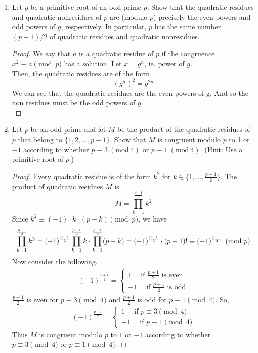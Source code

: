 \documentclass[11pt]{article}
\theoremstyle{definition}
\newcommand{\Mod}[1]{\ (\mathrm{mod}\ #1)}
\begin{document}
\begin{enumerate}
\begin{enumerate}
    \end{enumerate}

    \item Let $g$ be a primitive root of an odd prime $p$. Show that the quadratic residues and quadratic nonresidues of $p$ are (modulo $p$) precisely the even powers and odd powers of $g$, respectively. In particular, $p$ has the same number $(p-1)/2$ of quadratic residues and quadratic nonresidues.
    \begin{proof}
        We say that $a$ is a quadratic residue of $p$ 
        if the congruence $x^2\equiv a\pmod{p}$ has a solution.
        Let $x = g^n$, ie. power of $g$. \\
        Then, the quadratic residues are of the form
        \[
            (g^n)^2 = g^{2n}
        \]
        We can see that the quadratic residues are the even powers of g.
        And so the non residues must be the odd powers of $g$. \\
    \end{proof}

    \item Let $p$ be an odd prime and let $M$ be the product of the quadratic residues of $p$ that belong to $\{1,2,\dots, p-1\}$. Show that $M$ is congruent modulo $p$ to 1 or $-1$ according to whether $p\equiv 3\Mod 4$ or $p\equiv 1\Mod 4$. (Hint: Use a primitive root of $p$.)
    \begin{proof}
        Every quadratic residue is of the form $k^2$ for 
        $k\in\{1,\dots,\frac{p-1}{2}\}$. The product of quadratic residues $M$ is 
        \[
            M = \prod_{k=1}^{\frac{p-1}{2}} k^2
        \]
        Since $k^2\equiv (-1)\cdot k\cdot (p-k)\pmod{p}$, we have
        \[
            \prod_{k=1}^{\frac{p-1}{2}} k^2 = (-1)^{\frac{p-1}{2}}\prod_{k=1}^{\frac{p-1}{2}} k \cdot \prod_{k=1}^{\frac{p-1}{2}} (p-k) = (-1)^{\frac{p-1}{2}}\cdot (p-1)! \\
            \equiv (-1)^{\frac{p+1}{2}}\pmod{p}
        \]
        Now consider the following.
        \begin{align*}
            (-1)^{\frac{p+1}{2}} = 
            \begin{cases}
                1   \quad\text{ if } \frac{p+1}{2} \text{ is even} \\
                -1 \quad\text{ if } \frac{p+1}{2} \text{ is odd} 
            \end{cases}
        \end{align*}
        $\frac{p+1}{2}$ is even for $p\equiv 3\pmod{4}$ and
        $\frac{p+1}{2}$ is odd for $p\equiv 1\pmod{4}$. So,
        \begin{align*}
            (-1)^{\frac{p+1}{2}} = 
            \begin{cases}
                1   \quad\text{ if } p\equiv 3\pmod{4} \\
                -1 \quad\text{ if } p\equiv 1\pmod{4} 
            \end{cases}
        \end{align*}
        Thus $M$ is congruent modulo $p$ to $1$ or $-1$
        according to whether $p\equiv 3\pmod{4}$ or $p\equiv 1\pmod{4}$. 
    

\end{proof}
\end{enumerate}
\end{document}
